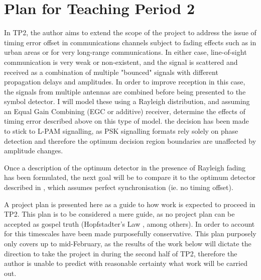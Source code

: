 \chapter{Plan for Teaching Period 2}

In TP2, the author aims to extend the scope of the project to address the issue of
timing error offset in communications channels subject to fading effects
such as in urban areas or for very long-range communications. In either
case, line-of-sight communication is very weak or non-existent, and the
signal is scattered and received as a combination of multiple
"bounced" signals with different propagation delays and amplitudes. In order to improve reception in this case, the signals from multiple antennas are combined before being presented to the symbol detector. I will model these using a Rayleigh distribution, and assuming an Equal Gain Combining (EGC or additive) receiver, determine the effects of
timing error described above on this type of model. the decision has been made to stick to
L-PAM signalling, as PSK signalling formats rely solely on phase
detection and therefore the optimum decision region boundaries are
unaffected by amplitude changes.

Once a description of the optimum detector in the presence of
Rayleigh fading has been formulated, the next goal will be to compare it to the optimum
detector described in \cite{[2]}, which assumes perfect
synchronisation (ie. no timing offset).

A project plan is presented here as a guide to how work is expected to
proceed in TP2. This plan is to be considered a mere guide, as no project plan can be accepted as gospel truth (Hopfstadter's Law \cite{[11]}, among others). In order to account for this timescales have been made purposefully conservative. This plan purposely only covers up to mid-February, as the results of the work below will dictate the direction to take the project in during the second half of TP2, therefore the author is unable to predict with reasonable certainty what work will be carried out.

